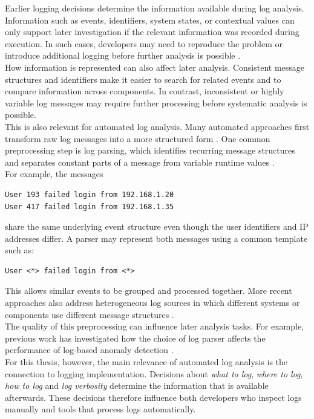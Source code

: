 Earlier logging decisions determine the information available during log analysis.
Information such as events, identifiers, system states, or contextual values can 
only support later investigation if the relevant information was recorded during execution.
In such cases, developers may need to reproduce the problem or introduce additional logging before further analysis is possible \cite{chen2021asurveyofsoftwareloginstrumentation}.
\\
How information is represented can also affect later analysis. 
Consistent message structures and identifiers make it easier to search for related events 
and to compare information across components. 
In contrast, inconsistent or highly variable log messages may require further processing before systematic analysis is possible.
\\
This is also relevant for automated log analysis. 
Many automated approaches first transform raw log messages into a more structured form \cite{he2021asurveyonautomatedloganalysis}. 
One common preprocessing step is log parsing, which identifies recurring message structures 
and separates constant parts of a message from variable runtime values \cite{dai2022logram,zhu2019toolsandbenchmarksforautomatedlogparsing}.
\\
For example, the messages

\begin{verbatim}
User 193 failed login from 192.168.1.20
User 417 failed login from 192.168.1.35
\end{verbatim}

share the same underlying event structure even though the user identifiers and IP addresses differ. 
A parser may represent both messages using a common template such as:

\begin{verbatim}
User <*> failed login from <*>
\end{verbatim}

This allows similar events to be grouped and processed together. 
More recent approaches also address heterogeneous log sources in which different 
systems or components use different message structures \cite{liu2022uniparser}.
\\
The quality of this preprocessing can influence later analysis tasks. 
For example, previous work has investigated how the choice of log parser affects the performance of log-based anomaly detection \cite{fu2022anempiricalstudy}.
\\
For this thesis, however, the main relevance of automated log analysis is the connection to logging implementation. 
Decisions about \textit{what to log}, \textit{where to log}, \textit{how to log} and \textit{log verbosity} 
determine the information that is available afterwards. 
These decisions therefore influence both developers who inspect logs manually and tools that process logs automatically.

